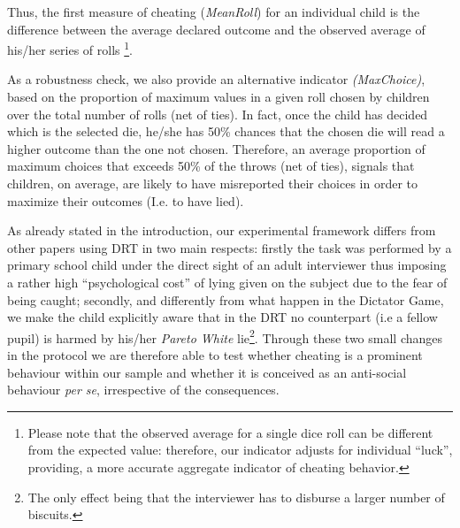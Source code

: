 \documentclass[authoryear, preprint, review, 12pt]{elsarticle}
\begin{document}
\begin{itemize}
Thus, the first measure of cheating (\textit{MeanRoll}) for an individual child is the difference between the average declared outcome and the observed average of his/her series of rolls \footnote{Please note that the observed average for a single dice roll can be different from the expected value: therefore, our indicator adjusts for individual \enquote{luck}, providing, a more accurate aggregate indicator of cheating behavior.}. 

As a robustness check, we also provide an alternative indicator \textit{(MaxChoice)}, based on the proportion of maximum values in a given roll chosen by children over the total number of rolls (net of ties). In fact, once the child has decided which is the selected die, he/she has 50\% chances that the chosen die will read a higher outcome than the one not chosen. Therefore, an average proportion of maximum choices that exceeds 50\% of the throws (net of ties), signals that children, on average, are likely to have misreported their choices in order to maximize their outcomes (I.e. to have lied).

As already stated in the introduction, our experimental framework differs from other papers using DRT \citep{shalvi2011justified, ff13, ariely2015true, houser2013perceptions, gachter2016intrinsic} in two main respects: firstly the task was performed by a primary school child under the direct sight of an adult interviewer thus imposing a rather high \enquote{psychological cost} of lying given on the subject due to the fear of being caught; secondly, and differently from what happen in the Dictator Game, we make the child explicitly aware that in the DRT no counterpart (i.e a fellow pupil) is harmed by his/her \textit{Pareto White} lie\footnote{The only effect being that the interviewer has to disburse a larger number of biscuits.}. Through these two small changes in the protocol we are therefore able to test whether cheating is a prominent behaviour within our sample and whether it is conceived as an anti-social behaviour \textit{per se}, irrespective of the consequences. 


\end{itemize}
\end{document}
